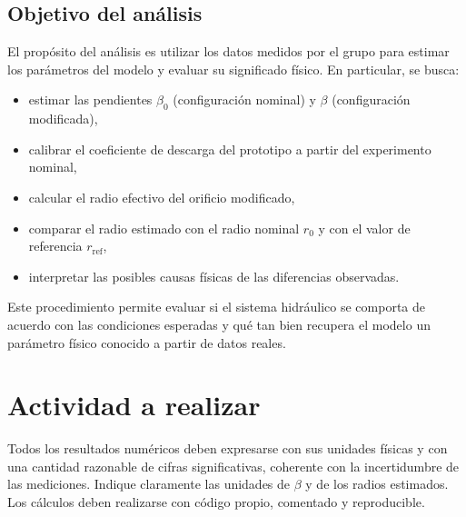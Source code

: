 \documentclass[oneside,letter,spanish,activeacute,english,links,10pt]{amcaGCS_EDO}
\begin{document}
	\subsection{Objetivo del análisis}
	El propósito del análisis es utilizar los datos medidos por el grupo para estimar los parámetros del modelo y evaluar su significado físico. En particular, se busca:
	\begin{itemize}
		\item estimar las pendientes $\beta_0$ (configuración nominal) y $\beta$ (configuración modificada),
		\item calibrar el coeficiente de descarga del prototipo a partir del experimento nominal,
		\item calcular el radio efectivo del orificio modificado,
		\item comparar el radio estimado con el radio nominal $r_0$ y con el valor de referencia $r_{\mathrm{ref}}$,
		\item interpretar las posibles causas físicas de las diferencias observadas.
	\end{itemize}
	Este procedimiento permite evaluar si el sistema hidráulico se comporta de acuerdo con las condiciones esperadas y qué tan bien recupera el modelo un parámetro físico conocido a partir de datos reales.
	
	\section{Actividad a realizar}
	Todos los resultados numéricos deben expresarse con sus unidades físicas y con una cantidad razonable de cifras significativas, coherente con la incertidumbre de las mediciones. Indique claramente las unidades de $\beta$ y de los radios estimados. Los cálculos deben realizarse con código propio, comentado y reproducible.
	
\end{document}
